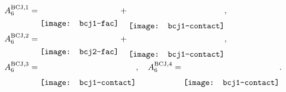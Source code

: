 \documentclass{standalone}
\begin{document}
$
\begin{aligned}
	A_6^{\text{BCJ},1}&=\raisebox{-5.4mm}{\texttt{[image: bcj1-fac]}}+\raisebox{-6.5mm}{\texttt{[image: bcj1-contact]}},\\
	A_6^{\text{BCJ},2}&=\raisebox{-5.4mm}{\texttt{[image: bcj2-fac]}}+\raisebox{-6.5mm}{\texttt{[image: bcj1-contact]}},\\
	A_6^{\text{BCJ},3}&=\raisebox{-6.5mm}{\texttt{[image: bcj1-contact]}},~~~A_6^{\text{BCJ},4}=\raisebox{-6.5mm}{\texttt{[image: bcj1-contact]}}.
\end{aligned}
$
\end{document}
